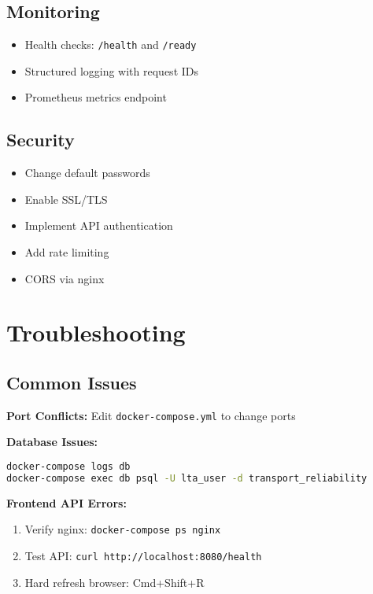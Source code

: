 \documentclass[11pt,a4paper]{article}
\begin{document}
\subsection{Monitoring}
\begin{itemize}[leftmargin=*]
    \item Health checks: \texttt{/health} and \texttt{/ready}
    \item Structured logging with request IDs
    \item Prometheus metrics endpoint
\end{itemize}

\subsection{Security}
\begin{itemize}[leftmargin=*]
    \item Change default passwords
    \item Enable SSL/TLS
    \item Implement API authentication
    \item Add rate limiting
    \item CORS via nginx
\end{itemize}

\section{Troubleshooting}

\subsection{Common Issues}

\textbf{Port Conflicts:} Edit \texttt{docker-compose.yml} to change ports

\textbf{Database Issues:}
\begin{lstlisting}[language=bash]
docker-compose logs db
docker-compose exec db psql -U lta_user -d transport_reliability
\end{lstlisting}

\textbf{Frontend API Errors:}
\begin{enumerate}[leftmargin=*]
    \item Verify nginx: \texttt{docker-compose ps nginx}
    \item Test API: \texttt{curl http://localhost:8080/health}
    \item Hard refresh browser: Cmd+Shift+R
\end{enumerate}
\end{document}
